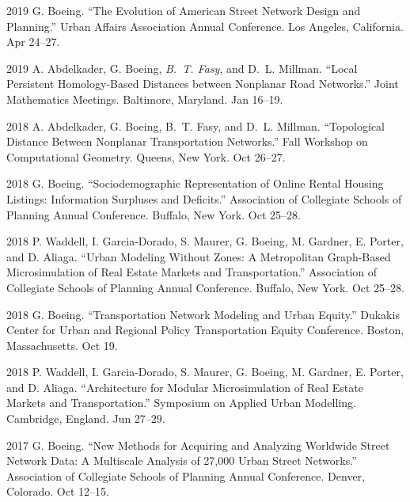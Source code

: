 \documentclass[11pt,letterpaper]{report}
\begin{document}
\begin{tablist}
        \item[2019] \tab{}G. Boeing. \enquote{The Evolution of American Street Network Design and Planning.} Urban Affairs Association Annual Conference. Los Angeles, California. Apr 24--27.

        \item[2019] \tab{}A. Abdelkader, G. Boeing, \textit{B.~T. Fasy}, and D.~L. Millman. \enquote{Local Persistent Homology-Based Distances between Nonplanar Road Networks.} Joint Mathematics Meetings. Baltimore, Maryland. Jan 16--19.

        \item[2018] \tab{}A. Abdelkader, G. Boeing, B.~T. Fasy, and D.~L. Millman. \enquote{Topological Distance Between Nonplanar Transportation Networks.} Fall Workshop on Computational Geometry. Queens, New York. Oct 26--27.

        \item[2018] \tab{}G. Boeing. \enquote{Sociodemographic Representation of Online Rental Housing Listings: Information Surpluses and Deficits.} Association of Collegiate Schools of Planning Annual Conference. Buffalo, New York. Oct 25--28.

        \item[2018] \tab{}P. Waddell, I. Garcia-Dorado, S. Maurer, G. Boeing, M. Gardner, E. Porter, and D. Aliaga. \enquote{Urban Modeling Without Zones: A Metropolitan Graph-Based Microsimulation of Real Estate Markets and Transportation.} Association of Collegiate Schools of Planning Annual Conference. Buffalo, New York. Oct 25--28.

        \item[2018] \tab{}G. Boeing. \enquote{Transportation Network Modeling and Urban Equity.} Dukakis Center for Urban and Regional Policy Transportation Equity Conference. Boston, Massachusetts. Oct 19.

        \item[2018] \tab{}P. Waddell, I. Garcia-Dorado, S. Maurer, G. Boeing, M. Gardner, E. Porter, and D. Aliaga. \enquote{Architecture for Modular Microsimulation of Real Estate Markets and Transportation.} Symposium on Applied Urban Modelling. Cambridge, England. Jun 27--29.

        \item[2017] \tab{}G. Boeing. \enquote{New Methods for Acquiring and Analyzing Worldwide Street Network Data: A Multiscale Analysis of 27,000 Urban Street Networks.} Association of Collegiate Schools of Planning Annual Conference. Denver, Colorado. Oct 12--15.


\end{tablist}
\end{document}
